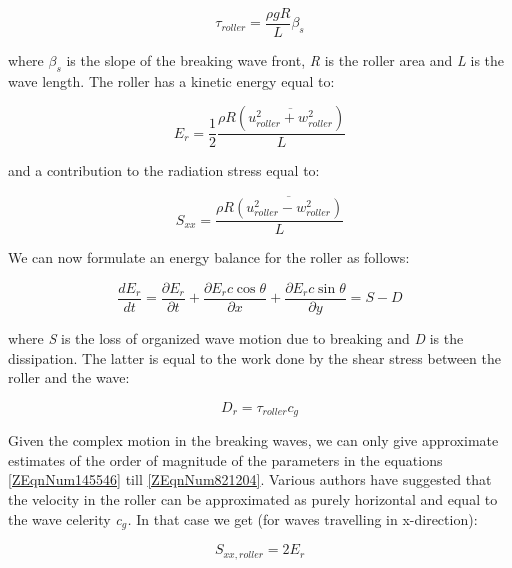 \documentclass{article}
\begin{document}
\noindent 
\begin{equation} \label{ZEqnNum145546} 
\tau _{roller} =\frac{\rho gR}{L} \beta _{s}  
\end{equation} 


\noindent where $\beta _{s} $ is the slope of the breaking wave front, \textit{R} is the roller area and \textit{L} is the wave length. The roller has a kinetic energy equal to:

\noindent 
\begin{equation} \label{ZEqnNum992472} 
E_{r} =\frac{1}{2} \frac{\rho R(\overline{u_{roller}^{2} +w_{roller}^{2} })}{L}  
\end{equation} 


\noindent and a contribution to the radiation stress equal to:

\noindent 
\begin{equation} \label{2.39)} 
S_{xx} =\frac{\rho R\overline{\left(u_{roller}^{2} -w_{roller}^{2} \right)}}{L}  
\end{equation} 


\noindent We can now formulate an energy balance for the roller as follows:

\noindent 
\begin{equation} \label{ZEqnNum923440} 
\frac{dE_{r} }{dt} =\frac{\partial E_{r} }{\partial t} +\frac{\partial E_{r} c\cos \theta }{\partial x} +\frac{\partial E_{r} c\sin \theta }{\partial y} =S-D 
\end{equation} 


\noindent where \textit{S} is the loss of organized wave motion due to breaking and \textit{D} is the dissipation.  The latter is equal to the work done by the shear stress between the roller and the wave:

\noindent 
\begin{equation} \label{ZEqnNum821204} 
D_{r} =\tau _{roller} c_{g}  
\end{equation} 


\noindent Given the complex motion in the breaking waves, we can only give approximate estimates of the order of magnitude of the parameters in the equations \eqref{ZEqnNum145546} till \eqref{ZEqnNum821204}. Various authors have suggested that the velocity in the roller can be approximated as purely horizontal and equal to the wave celerity \textit{c${}_{g}$. }In that case we get (for waves travelling in x-direction):

\noindent 
\begin{equation} \label{2.42)} 
S_{xx,roller} =2E_{r}  
\end{equation} 
\end{document}
